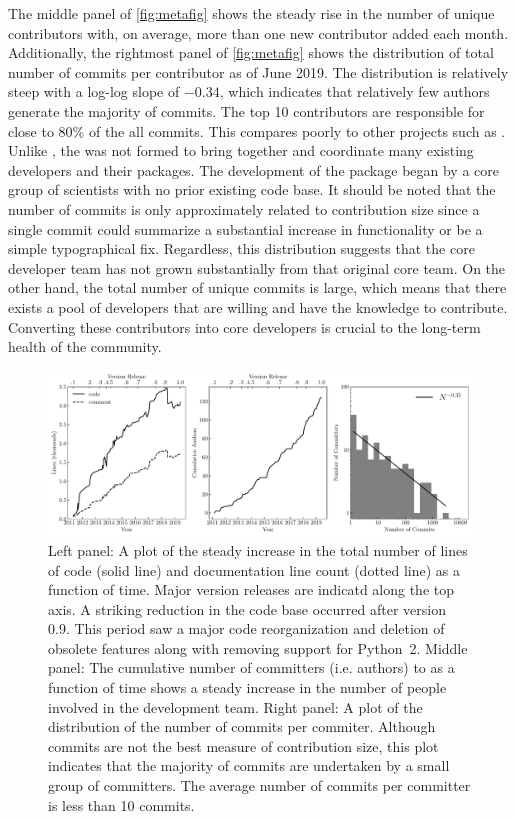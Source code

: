 The middle panel of \autoref{fig:metafig} shows the steady rise in the number of unique contributors with, on average, more than one new contributor added each month.
Additionally, the rightmost panel of \autoref{fig:metafig} shows the distribution of total number of commits per contributor as of June 2019.
The distribution is relatively steep with a log-log slope of $-0.34$, which indicates that relatively few authors generate the majority of commits.
The top 10 contributors are responsible for close to 80\% of the all commits.
This compares poorly to other projects such as \astropy \citep{astropy2018}.
Unlike \astropy, the \sunpyproj was not formed to bring together and coordinate many existing developers and their \python packages.
The development of the \sunpypkg package began by a core group of scientists with no prior existing code base.
It should be noted that the number of commits is only approximately related to contribution size since a single commit could summarize a substantial increase in functionality or be a simple typographical fix.
Regardless, this distribution suggests that the core developer team has not grown substantially from that original core team.
On the other hand, the total number of unique commits is large, which means that there exists a pool of \sunpypkg developers that are willing and have the knowledge to contribute.
Converting these contributors into core developers is crucial to the long-term health of the community.


\begin{figure}
    \center
    \includegraphics[width = 1.0\textwidth]{figures/dev_meta.pdf}
    \caption{Left panel: A plot of the steady increase in the total number of lines of code (solid line) and documentation line count (dotted line) as a function of time.
	Major version releases are indicatd along the top axis.
	A striking reduction in the code base occurred after version 0.9.
	This period saw a major code reorganization and deletion of obsolete features along with removing support for Python~2.
	Middle panel: The cumulative number of committers (i.e. authors) to \sunpypkg as a function of time shows a steady increase in the number of people involved in the development team.
	Right panel: A plot of the distribution of the number of commits per commiter.
	Although commits are not the best measure of contribution size, this plot indicates that the majority of commits are undertaken by a small group of committers. The average number of commits per committer is less than 10 commits.}
\label{fig:metafig}
\end{figure}
